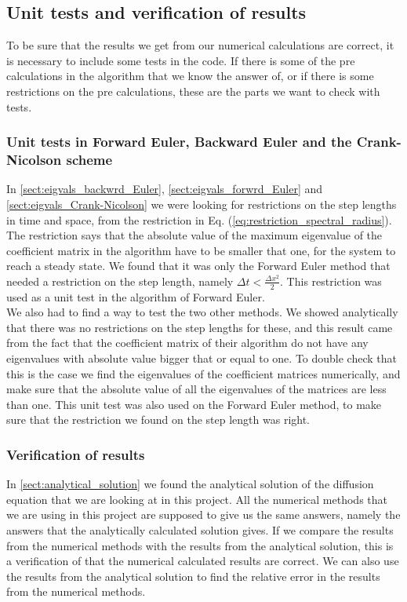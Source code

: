 \documentclass[12pt]{article}
\begin{document}
\begin{flushleft}
\subsection{Unit tests and verification of results}
To be sure that the results we get from our numerical calculations are correct, it is necessary to include some tests in the code. If there is some of the pre calculations in the algorithm that we know the answer of, or if there is some restrictions on the pre calculations, these are the parts we want to check with tests.
\subsubsection{Unit tests in Forward Euler, Backward Euler and the Crank-Nicolson scheme}
In \ref{sect:eigvals_backwrd_Euler}, \ref{sect:eigvals_forwrd_Euler} and \ref{sect:eigvals_Crank-Nicolson} we were looking for restrictions on the step lengths in time and space, from the restriction in Eq. (\ref{eq:restriction_spectral_radius}). The restriction says that the absolute value of the maximum eigenvalue of the coefficient matrix in the algorithm have to be smaller that one, for the system to reach a steady state. We found that it was only the Forward Euler method that needed a restriction on the step length, namely $\Delta t < \frac{\Delta x^2}{2}$. This restriction was used as a unit test in the algorithm of Forward Euler.\\
\vspace{5mm}
We also had to find a way to test the two other methods. We showed analytically that there was no restrictions on the step lengths for these, and this result came from the fact that the coefficient matrix of their algorithm do not have any eigenvalues with absolute value bigger that or equal to one. To double check that this is the case we find the eigenvalues of the coefficient matrices numerically, and make sure that the absolute value of all the eigenvalues of the matrices are less than one. This unit test was also used on the Forward Euler method, to make sure that the restriction we found on the step length was right. 

\subsubsection{Verification of results}
In \ref{sect:analytical_solution} we found the analytical solution of the diffusion equation that we are looking  at in this project. All the numerical methods that we are using in this project are supposed to give us the same answers, namely the answers that the analytically calculated solution gives. If we compare the results from the numerical methods with the results from the analytical solution, this is a verification of that the numerical calculated results are correct. We can also use the results from the analytical solution to find the relative error in the results from the numerical methods.



\end{flushleft}
\end{document}
